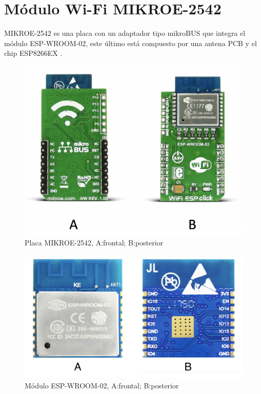 \section{Módulo Wi-Fi MIKROE-2542}

MIKROE-2542 es una placa con un adaptador tipo mikroBUS que integra el módulo ESP-WROOM-02, este último está compuesto por una antena PCB y el chip ESP8266EX \citep{MarcoTeorico5}.

\begin{figure}[H]
	\centering
	\includegraphics[scale=.4]{Capitulo2/images/mikroe.png}
	\caption{Placa MIKROE-2542, A:frontal; B:posterior}
	\label{fig:diagrama_dispensador}
\end{figure}
\paragraph{}

\begin{figure}[H]
	\centering
	\includegraphics[scale=.2]{Capitulo2/images/wroom.png}
	\caption{Módulo ESP-WROOM-02, A:frontal; B:posterior}
	\label{fig:diagrama_dispensador}
\end{figure}


